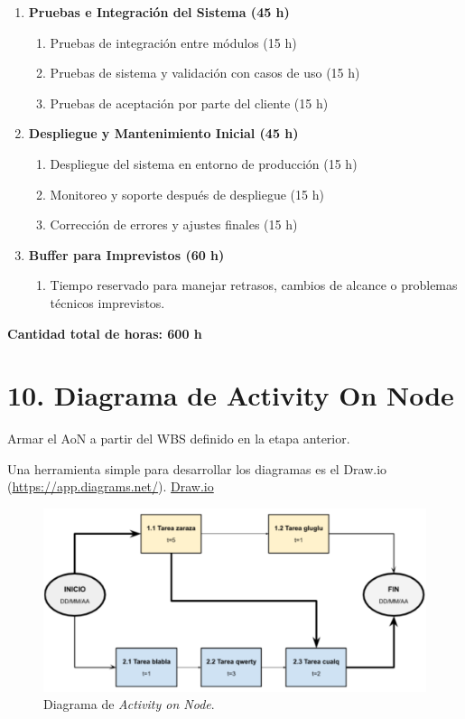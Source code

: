 \documentclass[
11pt, %
]{charter}
\begin{document}
\begin{enumerate}
\begin{enumerate}
\end{enumerate}
\item \textbf{Pruebas e Integración del Sistema (45 h)}
\begin{enumerate}
\item Pruebas de integración entre módulos (15 h)
\item Pruebas de sistema y validación con casos de uso (15 h)
\item Pruebas de aceptación por parte del cliente (15 h)
\end{enumerate}
\item \textbf{Despliegue y Mantenimiento Inicial (45 h)}
\begin{enumerate}
\item Despliegue del sistema en entorno de producción (15 h)
\item Monitoreo y soporte después de despliegue (15 h)
\item Corrección de errores y ajustes finales (15 h)
\end{enumerate}
\item \textbf{Buffer para Imprevistos (60 h)}
\begin{enumerate}
\item Tiempo reservado para manejar retrasos, cambios de alcance o problemas técnicos imprevistos.
\end{enumerate}
\end{enumerate}

\textbf{Cantidad total de horas: 600 h}


\section{10. Diagrama de Activity On Node}
\label{sec:AoN}

Armar el AoN a partir del WBS definido en la etapa anterior.

Una herramienta simple para desarrollar los diagramas es el Draw.io (\url{https://app.diagrams.net/}).
\href{https://app.diagrams.net}{Draw.io}




\begin{figure}[htpb]
\centering 
\includegraphics[width=.8\textwidth]{./Figuras/AoN.png}
\caption{Diagrama de \textit{Activity on Node}.}
\label{fig:AoN}
\end{figure}
\end{document}
